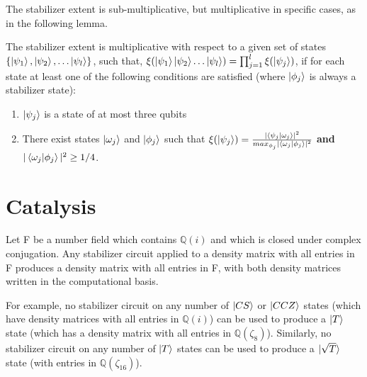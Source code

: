 \documentclass[12pt]{dalthesis}
\begin{document}
The stabilizer extent is sub-multiplicative, but multiplicative in specific cases, as in the following lemma.

\begin{lemma}
\label{stabextent}
The stabilizer extent is multiplicative with respect to a given set of states $\{ \ket{\psi_1}, \ket{\psi_2}, \dots \ket{\psi_l} \}$, such that, $\xi (\ket{\psi_1}\ket{\psi_2} \dots \ket{\psi_l}) = \prod_{j=1}^l \xi (\ket{\psi_j})$, if for each state at least one of the following conditions are satisfied (where $\ket{\phi_j}$ is always a stabilizer state):
\begin{enumerate}
\item $\ket{\psi_j}$ is a state of at most three qubits
\item There exist states $\ket{\omega_j}$ and $\ket{\phi_j}$ such that $\xi (\ket{\psi_j}) = \frac{|\braket{\psi_j| \omega_j}|^2}{max_{\phi_j}|\braket{\omega_j |\phi_j}|^2}$ \textbf{and} $|\braket{\omega_j | \phi_j}|^2 \geq 1/4$.
\end{enumerate}
\end{lemma}

\section{Catalysis}

\begin{theorem}
Let F be a number field which contains $\mathbb{Q}(i)$ and which is closed under complex conjugation. Any stabilizer circuit applied to a density matrix with all entries in F produces a density matrix with all entries in F, with both density matrices written in the computational basis.
\end{theorem}

For example, no stabilizer circuit on any number of $\ket{CS}$ or $\ket{CCZ}$ states (which have density matrices with all entries in $\mathbb{Q}(i)$) can be used to produce a $\ket{T}$ state (which has a density matrix with all entries in $\mathbb{Q}(\zeta_8)$). Similarly, no stabilizer circuit on any number of $\ket{T}$ states can be used to produce a $\ket{\sqrt{T}}$ state (with entries in $\mathbb{Q}(\zeta_{16})$).
 
\end{document}
